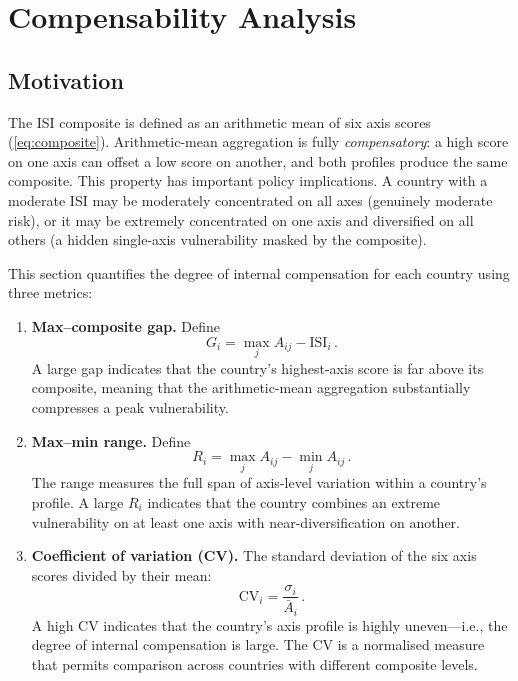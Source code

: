 \section{Compensability Analysis}\label{sec:compensability}

\subsection{Motivation}

The ISI composite is defined as an arithmetic mean of six axis scores
(\cref{eq:composite}).  Arithmetic-mean aggregation is fully
\emph{compensatory}: a high score on one axis can offset a low score
on another, and both profiles produce the same composite.  This
property has important policy implications.  A country with a
moderate ISI may be moderately concentrated on all axes (genuinely
moderate risk), or it may be extremely concentrated on one axis and
diversified on all others (a hidden single-axis vulnerability masked
by the composite).

This section quantifies the degree of internal compensation for each
country using three metrics:

\begin{enumerate}[leftmargin=2em]
  \item \textbf{Max--composite gap.}  Define
    \begin{equation}\label{eq:compensability-gap}
      G_i = \max_j A_{ij} - \text{ISI}_i\,.
    \end{equation}
    A large gap indicates that the country's highest-axis score is
    far above its composite, meaning that the arithmetic-mean
    aggregation substantially compresses a peak vulnerability.
  \item \textbf{Max--min range.}  Define
    \begin{equation}\label{eq:compensability-range}
      R_i = \max_j A_{ij} - \min_j A_{ij}\,.
    \end{equation}
    The range measures the full span of axis-level variation within a
    country's profile.  A large $R_i$ indicates that the country
    combines an extreme vulnerability on at least one axis with
    near-diversification on another.
  \item \textbf{Coefficient of variation (CV).}  The standard deviation
    of the six axis scores divided by their mean:
    \begin{equation}\label{eq:compensability-cv}
      \text{CV}_i = \frac{\sigma_i}{\bar{A}_i}\,.
    \end{equation}
    A high CV indicates that
    the country's axis profile is highly uneven---i.e., the degree of
    internal compensation is large.  The CV is a normalised
    measure that permits comparison across countries with different
    composite levels.
\end{enumerate}

